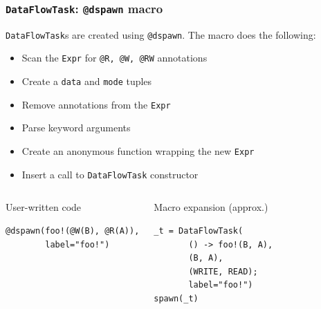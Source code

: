 \documentclass{beamer}
\begin{document}
\begin{frame}[fragile]

\frametitle{\texttt{DataFlowTask}: \texttt{@dspawn} macro}

\texttt{DataFlowTask}s are created using \texttt{@dspawn}. The macro
does the following:

\begin{itemize}
    \item Scan the \texttt{Expr} for \texttt{@R, @W, @RW} annotations
    \item Create a \texttt{data} and \texttt{mode}
    tuples
    \item Remove annotations from the \texttt{Expr}
    \item Parse keyword arguments    
    \item Create an anonymous function wrapping the new \texttt{Expr}
    \item Insert a call to \texttt{DataFlowTask} constructor
\end{itemize}

\begin{columns}

\begin{exampleblock}{User-written code}    
\begin{verbatim}
@dspawn(foo!(@W(B), @R(A)),
        label="foo!")
\end{verbatim}
\end{exampleblock}


\begin{exampleblock}{Macro expansion (approx.)}
\begin{verbatim}
_t = DataFlowTask(
       () -> foo!(B, A),
       (B, A),
       (WRITE, READ);
       label="foo!")
spawn(_t)
\end{verbatim}
\end{exampleblock}

\end{columns}
%

\end{frame} 
\end{document}
